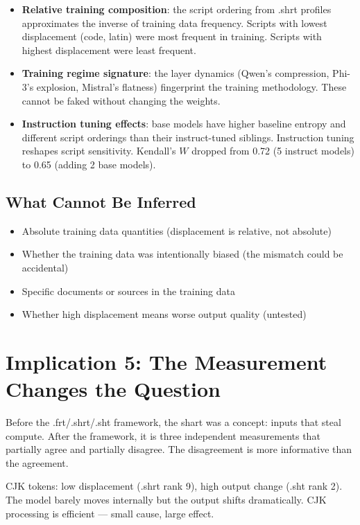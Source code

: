 \documentclass[11pt,a4paper]{article}
\begin{document}
\begin{itemize}[nosep]
\item \textbf{Relative training composition}: the script ordering from .shrt profiles approximates the inverse of training data frequency. Scripts with lowest displacement (code, latin) were most frequent in training. Scripts with highest displacement were least frequent.
\item \textbf{Training regime signature}: the layer dynamics (Qwen's compression, Phi-3's explosion, Mistral's flatness) fingerprint the training methodology. These cannot be faked without changing the weights.
\item \textbf{Instruction tuning effects}: base models have higher baseline entropy and different script orderings than their instruct-tuned siblings. Instruction tuning reshapes script sensitivity. Kendall's $W$ dropped from 0.72 (5 instruct models) to 0.65 (adding 2 base models).
\end{itemize}

\subsection{What Cannot Be Inferred}

\begin{itemize}[nosep]
\item Absolute training data quantities (displacement is relative, not absolute)
\item Whether the training data was intentionally biased (the mismatch could be accidental)
\item Specific documents or sources in the training data
\item Whether high displacement means worse output quality (untested)
\end{itemize}

\section{Implication 5: The Measurement Changes the Question}

Before the .frt/.shrt/.sht framework, the shart was a concept: inputs that steal compute. After the framework, it is three independent measurements that partially agree and partially disagree. The disagreement is more informative than the agreement.

CJK tokens: low displacement (.shrt rank 9), high output change (.sht rank 2). The model barely moves internally but the output shifts dramatically. CJK processing is efficient --- small cause, large effect.
\end{document}
